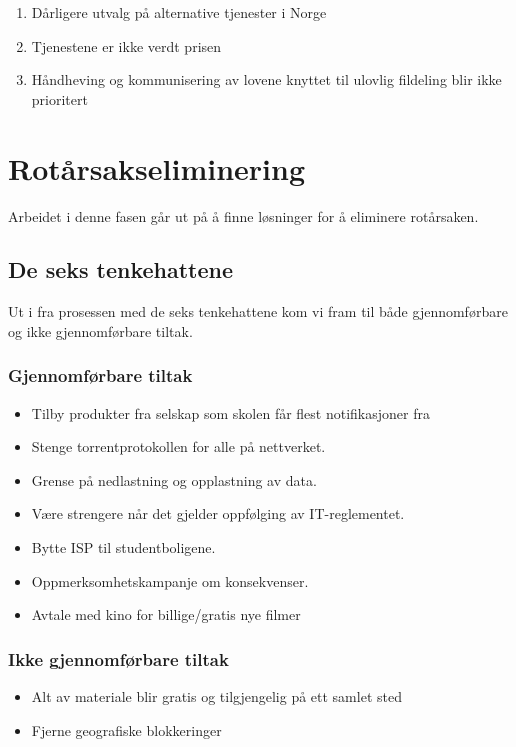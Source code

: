 \begin{enumerate}
    \item Dårligere utvalg på alternative tjenester i Norge
    \item Tjenestene er ikke verdt prisen
    \item Håndheving og kommunisering av lovene knyttet til ulovlig fildeling blir ikke prioritert
\end{enumerate}

\section{Rotårsakseliminering}
Arbeidet i denne fasen går ut på å finne løsninger for å eliminere rotårsaken.

\subsection{De seks tenkehattene}

Ut i fra prosessen med de seks tenkehattene kom vi fram til både gjennomførbare og ikke gjennomførbare tiltak. 
\subsubsection{Gjennomførbare tiltak}
\begin{itemize}
    \item Tilby produkter fra selskap som skolen får flest notifikasjoner fra
    \item Stenge torrentprotokollen for alle på nettverket.
    \item Grense på nedlastning og opplastning av data.
    \item Være strengere når det gjelder oppfølging av IT-reglementet. 
    \item Bytte ISP til studentboligene.
    \item Oppmerksomhetskampanje om konsekvenser.
    \item Avtale med kino for billige/gratis nye filmer
\end{itemize}

\subsubsection{Ikke gjennomførbare tiltak}
\begin{itemize}
    \item Alt av materiale blir gratis og tilgjengelig på ett samlet sted
    \item Fjerne geografiske blokkeringer
\end{itemize}

